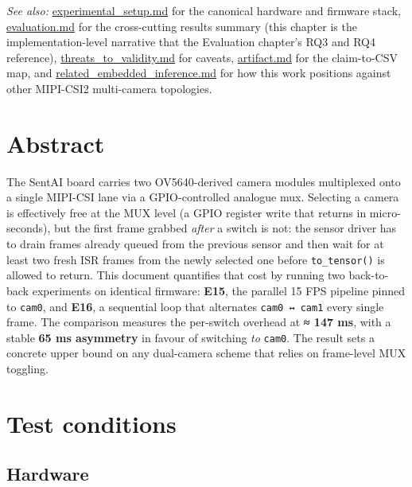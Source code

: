 \emph{See also:} \url{experimental_setup.md} for the canonical hardware
and firmware stack, \url{evaluation.md} for the cross-cutting results
summary (this chapter is the implementation-level narrative that the
Evaluation chapter's RQ3 and RQ4 reference),
\url{threats_to_validity.md} for caveats, \url{artifact.md} for the
claim-to-CSV map, and \url{related_embedded_inference.md} for how this
work positions against other MIPI-CSI2 multi-camera topologies.

\section{Abstract}\label{abstract}

The SentAI board carries two OV5640-derived camera modules multiplexed
onto a single MIPI-CSI lane via a GPIO-controlled analogue mux.
Selecting a camera is effectively free at the MUX level (a GPIO register
write that returns in micro-seconds), but the first frame grabbed
\emph{after} a switch is not: the sensor driver has to drain frames
already queued from the previous sensor and then wait for at least two
fresh ISR frames from the newly selected one before
\texttt{to\_tensor()} is allowed to return. This document quantifies
that cost by running two back-to-back experiments on identical firmware:
\textbf{E15}, the parallel 15 FPS pipeline pinned to \texttt{cam0}, and
\textbf{E16}, a sequential loop that alternates \texttt{cam0\ ↔\ cam1}
every single frame. The comparison measures the per-switch overhead at
\textbf{≈ 147 ms}, with a stable \textbf{65 ms asymmetry} in favour of
switching \emph{to} \texttt{cam0}. The result sets a concrete upper
bound on any dual-camera scheme that relies on frame-level MUX toggling.

\section{Test conditions}\label{test-conditions}

\subsection{Hardware}\label{hardware}

